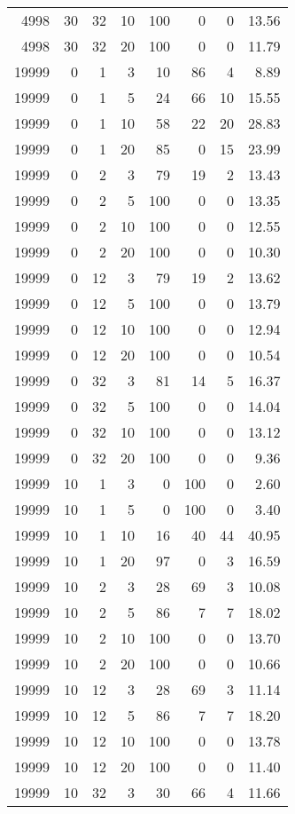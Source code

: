 \begin{tabular}{rrrrrrrr}
4998 & 30 & 32 & 10 & 100 & 0 & 0 & 13.56 \\
4998 & 30 & 32 & 20 & 100 & 0 & 0 & 11.79 \\
19999 & 0 & 1 & 3 & 10 & 86 & 4 & 8.89 \\
19999 & 0 & 1 & 5 & 24 & 66 & 10 & 15.55 \\
19999 & 0 & 1 & 10 & 58 & 22 & 20 & 28.83 \\
19999 & 0 & 1 & 20 & 85 & 0 & 15 & 23.99 \\
19999 & 0 & 2 & 3 & 79 & 19 & 2 & 13.43 \\
19999 & 0 & 2 & 5 & 100 & 0 & 0 & 13.35 \\
19999 & 0 & 2 & 10 & 100 & 0 & 0 & 12.55 \\
19999 & 0 & 2 & 20 & 100 & 0 & 0 & 10.30 \\
19999 & 0 & 12 & 3 & 79 & 19 & 2 & 13.62 \\
19999 & 0 & 12 & 5 & 100 & 0 & 0 & 13.79 \\
19999 & 0 & 12 & 10 & 100 & 0 & 0 & 12.94 \\
19999 & 0 & 12 & 20 & 100 & 0 & 0 & 10.54 \\
19999 & 0 & 32 & 3 & 81 & 14 & 5 & 16.37 \\
19999 & 0 & 32 & 5 & 100 & 0 & 0 & 14.04 \\
19999 & 0 & 32 & 10 & 100 & 0 & 0 & 13.12 \\
19999 & 0 & 32 & 20 & 100 & 0 & 0 & 9.36 \\
19999 & 10 & 1 & 3 & 0 & 100 & 0 & 2.60 \\
19999 & 10 & 1 & 5 & 0 & 100 & 0 & 3.40 \\
19999 & 10 & 1 & 10 & 16 & 40 & 44 & 40.95 \\
19999 & 10 & 1 & 20 & 97 & 0 & 3 & 16.59 \\
19999 & 10 & 2 & 3 & 28 & 69 & 3 & 10.08 \\
19999 & 10 & 2 & 5 & 86 & 7 & 7 & 18.02 \\
19999 & 10 & 2 & 10 & 100 & 0 & 0 & 13.70 \\
19999 & 10 & 2 & 20 & 100 & 0 & 0 & 10.66 \\
19999 & 10 & 12 & 3 & 28 & 69 & 3 & 11.14 \\
19999 & 10 & 12 & 5 & 86 & 7 & 7 & 18.20 \\
19999 & 10 & 12 & 10 & 100 & 0 & 0 & 13.78 \\
19999 & 10 & 12 & 20 & 100 & 0 & 0 & 11.40 \\
19999 & 10 & 32 & 3 & 30 & 66 & 4 & 11.66 \\

\end{tabular}
